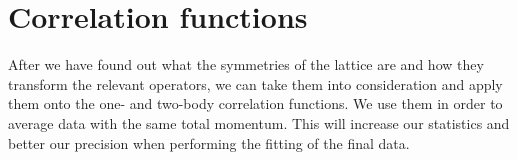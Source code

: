 
  
\section{Correlation functions}
\label{sec:sym-corr}

After we have found out what the symmetries of the lattice are and how they transform the relevant operators, we can take them into consideration and apply them onto the one- and two-body correlation functions. We use them in order to average data with the same total momentum. This will increase our statistics and better our precision when performing the fitting of the final data.

